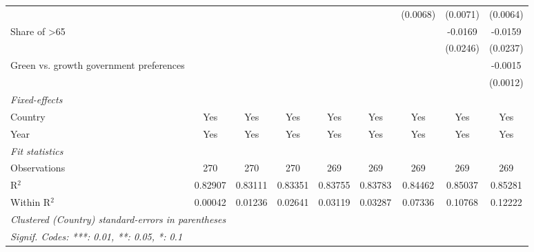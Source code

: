 \begin{table}[htbp]
\begin{tabular}{lcccccccc}
                                                     &          &          &          &          &              & (0.0068)     & (0.0071)     & (0.0064)\\   
      Share of >65                                   &          &          &          &          &              &              & -0.0169      & -0.0159\\   
                                                     &          &          &          &          &              &              & (0.0246)     & (0.0237)\\   
      Green vs. growth government preferences        &          &          &          &          &              &              &              & -0.0015\\   
                                                     &          &          &          &          &              &              &              & (0.0012)\\   
      \midrule
      \emph{Fixed-effects}\\
      Country                                        & Yes      & Yes      & Yes      & Yes      & Yes          & Yes          & Yes          & Yes\\  
      Year                                           & Yes      & Yes      & Yes      & Yes      & Yes          & Yes          & Yes          & Yes\\  
      \midrule
      \emph{Fit statistics}\\
      Observations                                   & 270      & 270      & 270      & 269      & 269          & 269          & 269          & 269\\  
      R$^2$                                          & 0.82907  & 0.83111  & 0.83351  & 0.83755  & 0.83783      & 0.84462      & 0.85037      & 0.85281\\  
      Within R$^2$                                   & 0.00042  & 0.01236  & 0.02641  & 0.03119  & 0.03287      & 0.07336      & 0.10768      & 0.12222\\  
      \midrule \midrule
      \multicolumn{9}{l}{\emph{Clustered (Country) standard-errors in parentheses}}\\
      \multicolumn{9}{l}{\emph{Signif. Codes: ***: 0.01, **: 0.05, *: 0.1}}\\
   \end{tabular}
\end{table}


